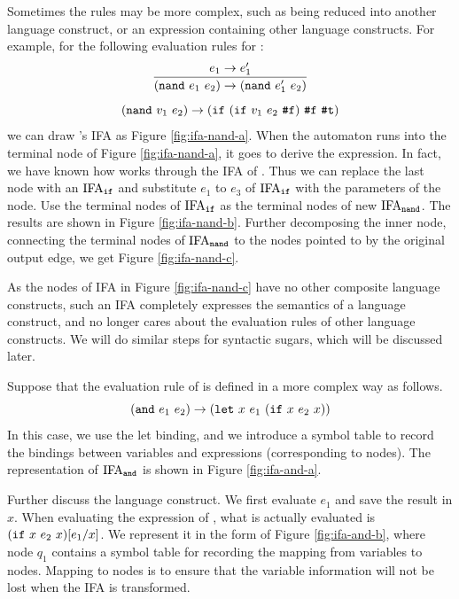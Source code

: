 \begin{example}
    Sometimes the rules may be more complex, such as being reduced into another language construct, or an expression containing other language constructs. For example, for the following evaluation rules for :
    \[
        \infer{(\m{nand}~e_1~e_2) \to (\m{nand}~e_1'~e_2)}{e_1 \to e_1'}
    \]\[
        (\mbox{\tt nand}~v_1~e_2) \to (\mbox{\tt if}~(\mbox{\tt if}~v_1~e_2~\mbox{\tt \#f})~\mbox{\tt \#f}~\mbox{\tt \#t})
    \]
    we can draw 's IFA as Figure \ref{fig:ifa-nand-a}.
    When the automaton runs into the terminal node of Figure \ref{fig:ifa-nand-a}, it goes to derive the  expression. In fact, we have known how  works through the IFA of . Thus we can replace the last node with an $\text{IFA}_{\mbox{\tt \scriptsize if}}$ and substitute $e_1$ to $e_3$ of $\text{IFA}_{\mbox{\tt \scriptsize if}}$ with the parameters of the node. Use the terminal nodes of $\text{IFA}_{\mbox{\tt \scriptsize if}}$ as the terminal nodes of new $\text{IFA}_{\mbox{\tt \scriptsize \scriptsize nand}}$. The results are shown in Figure \ref{fig:ifa-nand-b}. Further decomposing the inner  node, connecting the terminal nodes of $\text{IFA}_{\mbox{\tt \scriptsize nand}}$ to the nodes pointed to by the original output edge, we get Figure \ref{fig:ifa-nand-c}.

    As the nodes of IFA in Figure \ref{fig:ifa-nand-c} have no other composite language constructs, such an IFA completely expresses the semantics of a language construct, and no longer cares about the evaluation rules of other language constructs. We will do similar steps for syntactic sugars, which will be discussed later.
    \myend
\end{example}

\begin{example}

    Suppose that the evaluation rule of  is defined in a more complex way as follows.
    \[
        (\mbox{\tt and}~e_1~e_2) \to (\mbox{\tt let}~x~e_1~(\mbox{\tt if}~x~e_2~x))
    \]
    In this case, we use the let binding, and we introduce a symbol table to record the bindings between variables and expressions (corresponding to nodes). The representation of $\text{IFA}_{\mbox{\tt \scriptsize and}}$ is shown in Figure \ref{fig:ifa-and-a}.

    Further discuss the language construct. We first evaluate $e_1$ and save the result in $x$. When evaluating the expression of , what is actually evaluated is $(\mbox{\tt if}~x~e_2~x)[e_1/x]$. We represent it in the form of Figure \ref{fig:ifa-and-b}, where node $q_1$ contains a symbol table for recording the mapping from variables to nodes.
    Mapping to nodes is to ensure that the variable information will not be lost when the IFA is transformed.
    \myend
\end{example}


